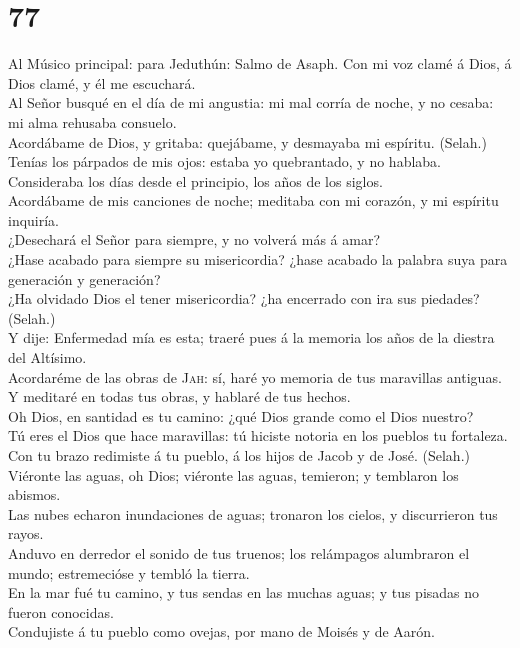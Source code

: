 \hypertarget{section-19-77}{%
\section{77}\label{section-19-77}}

 Al Músico principal: para Jeduthún: Salmo de Asaph. Con
mi voz clamé á Dios, á Dios clamé, y él me escuchará.\\
 Al Señor busqué en el día de mi angustia: mi mal corría
de noche, y no cesaba: mi alma rehusaba consuelo.\\
 Acordábame de Dios, y gritaba: quejábame, y desmayaba mi
espíritu. (Selah.)\\
 Tenías los párpados de mis ojos: estaba yo quebrantado, y
no hablaba.\\
 Consideraba los días desde el principio, los años de los
siglos.\\
 Acordábame de mis canciones de noche; meditaba con mi
corazón, y mi espíritu inquiría.\\
 ¿Desechará el Señor para siempre, y no volverá más á
amar?\\
 ¿Hase acabado para siempre su misericordia? ¿hase acabado
la palabra suya para generación y generación?\\
 ¿Ha olvidado Dios el tener misericordia? ¿ha encerrado
con ira sus piedades? (Selah.)\\
 Y dije: Enfermedad mía es esta; traeré pues á la memoria
los años de la diestra del Altísimo.\\
 Acordaréme de las obras de \textsc{Jah}: sí, haré yo
memoria de tus maravillas antiguas.\\
 Y meditaré en todas tus obras, y hablaré de tus
hechos.\\
 Oh Dios, en santidad es tu camino: ¿qué Dios grande como
el Dios nuestro?\\
 Tú eres el Dios que hace maravillas: tú hiciste notoria
en los pueblos tu fortaleza.\\
 Con tu brazo redimiste á tu pueblo, á los hijos de Jacob
y de José. (Selah.)\\
 Viéronte las aguas, oh Dios; viéronte las aguas,
temieron; y temblaron los abismos.\\
 Las nubes echaron inundaciones de aguas; tronaron los
cielos, y discurrieron tus rayos.\\
 Anduvo en derredor el sonido de tus truenos; los
relámpagos alumbraron el mundo; estremecióse y tembló la tierra.\\
 En la mar fué tu camino, y tus sendas en las muchas
aguas; y tus pisadas no fueron conocidas.\\
 Condujiste á tu pueblo como ovejas, por mano de Moisés y
de Aarón.

